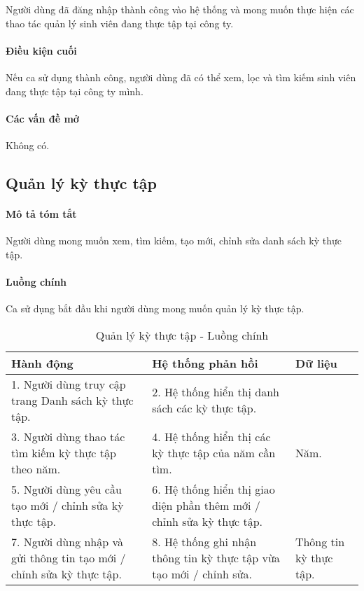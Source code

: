 \documentclass[./../main.tex]{subfiles}
\begin{document}
Người dùng đã đăng nhập thành công vào hệ thống và mong muốn thực hiện các thao tác quản lý sinh viên đang thực tập tại công ty.

\paragraph*{Điều kiện cuối}

Nếu ca sử dụng thành công, người dùng đã có thể xem, lọc và tìm kiếm sinh viên đang thực tập tại công ty mình.

\paragraph*{Các vấn đề mở}

Không có.

\subsection{Quản lý kỳ thực tập}

\paragraph*{Mô tả tóm tắt}

Người dùng mong muốn xem, tìm kiếm, tạo mới, chỉnh sửa danh sách kỳ thực tập.

\paragraph*{Luồng chính} Ca sử dụng bắt đầu khi người dùng mong muốn quản lý kỳ thực tập.

\begin{table}[H]
	\caption{Quản lý kỳ thực tập - Luồng chính}
	\label{tab:manage_terms}
	\begin{tabularx}{\textwidth}{|X|X|X|}
		\hline
		\textbf{Hành động}                                                   & \textbf{Hệ thống phản hồi}                                            & \textbf{Dữ liệu}       \\ \hline
		1. Người dùng truy cập trang Danh sách kỳ thực tập.                  & 2. Hệ thống hiển thị danh sách các kỳ thực tập.                       &                        \\ \hline
		3. Người dùng thao tác tìm kiếm kỳ thực tập theo năm.                & 4. Hệ thống hiển thị các kỳ thực tập của năm cần tìm.                 & Năm.                   \\ \hline
		5. Người dùng yêu cầu tạo mới / chỉnh sửa kỳ thực tập.               & 6. Hệ thống hiển thị giao diện phần thêm mới / chỉnh sửa kỳ thực tập. &                        \\ \hline
		7. Người dùng nhập và gửi thông tin tạo mới / chỉnh sửa kỳ thực tập. & 8. Hệ thống ghi nhận thông tin kỳ thực tập vừa tạo mới / chỉnh sửa.   & Thông tin kỳ thực tập. \\ \hline
	\end{tabularx}
\end{table}
\end{document}
